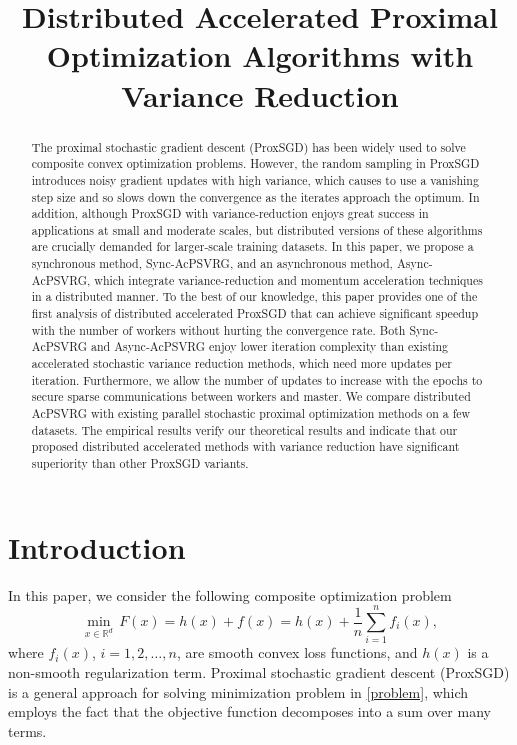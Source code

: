 \documentclass[letterpaper]{article} %
\newcommand*{\R}{\mathbb{R}}
\begin{document}
%
\title{Distributed Accelerated Proximal Optimization Algorithms with Variance Reduction
}
\maketitle

\begin{abstract}
    The proximal stochastic gradient descent (ProxSGD) has been widely used to solve composite convex optimization problems. However, the random sampling in ProxSGD introduces noisy gradient updates with high variance, which causes to use a vanishing step size and so slows down the convergence as the iterates approach the optimum.  In addition, although ProxSGD with variance-reduction enjoys great success in applications at small and moderate scales, but distributed versions of these algorithms are crucially demanded for larger-scale training datasets. In this paper, we propose a synchronous method, Sync-AcPSVRG, and an asynchronous method, Async-AcPSVRG, which integrate variance-reduction and momentum acceleration techniques in a distributed manner. To the best of our knowledge, this paper provides one of the first analysis of distributed accelerated ProxSGD that can achieve significant speedup with the number of workers without hurting the convergence rate. Both Sync-AcPSVRG and Async-AcPSVRG enjoy lower iteration  complexity than existing  accelerated  stochastic  variance  reduction  methods, which need more updates per iteration. Furthermore, we allow the number of updates to increase with the epochs to secure sparse communications between workers and master. We compare distributed AcPSVRG with existing parallel stochastic proximal optimization methods on a few datasets. The empirical results verify our theoretical results and indicate that our proposed distributed accelerated methods with variance reduction have significant superiority  than other ProxSGD variants.
\end{abstract}


\section{Introduction}

In this paper, we consider the following composite optimization problem 
\begin{equation}\label{problem}
    \min_{x\in\R^d}\,F(x) = h(x) + f(x)= h(x) + \frac{1}{n} \sum_{i=1}^n f_i(x),
\end{equation}
where $f_i(x)$, $i=1,2,\ldots,n$, are smooth convex loss functions, and $h(x)$ is a non-smooth regularization term. Proximal stochastic gradient descent (ProxSGD) \cite{Nemirovski2009} is a general approach for solving minimization problem in \eqref{problem}, which employs the fact that the objective function decomposes into a sum over many terms. 
\end{document}
